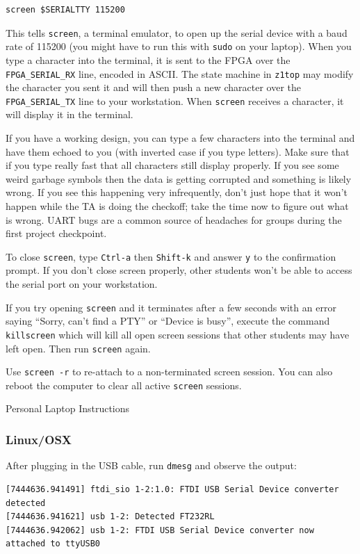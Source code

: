 \documentclass[11pt]{article}
\makeatletter
\renewcommand{\subsection}
{\@startsection {subsection}{1}{0pt}
 {-1ex}
 {0.5ex}
 {\bfseries\normalsize}}
\makeatother
\begin{document}
\begin{verbatim}
screen $SERIALTTY 115200
\end{verbatim}

This tells \verb|screen|, a terminal emulator, to open up the serial device with a baud rate of 115200 (you might have to run this with \verb|sudo| on your laptop).
When you type a character into the terminal, it is sent to the FPGA over the \verb|FPGA_SERIAL_RX| line, encoded in ASCII.
The state machine in \verb|z1top| may modify the character you sent it and will then push a new character over the \verb|FPGA_SERIAL_TX| line to your workstation.
When \verb|screen| receives a character, it will display it in the terminal.

If you have a working design, you can type a few characters into the terminal and have them echoed to you (with inverted case if you type letters).
Make sure that if you type really fast that all characters still display properly.
If you see some weird garbage symbols then the data is getting corrupted and something is likely wrong.
If you see this happening very infrequently, don't just hope that it won't happen while the TA is doing the checkoff; take the time now to figure out what is wrong.
UART bugs are a common source of headaches for groups during the first project checkpoint.

To close \verb|screen|, type \verb|Ctrl-a| then \verb|Shift-k| and answer \verb|y| to the confirmation prompt.
If you don't close screen properly, other students won't be able to access the serial port on your workstation.

If you try opening \verb|screen| and it terminates after a few seconds with an error saying ``Sorry, can't find a PTY'' or ``Device is busy'', execute the command \verb|killscreen| which will kill all open screen sessions that other students may have left open.
Then run \verb|screen| again.

Use \verb|screen -r| to re-attach to a non-terminated screen session. You can also reboot the computer to clear all active \verb|screen| sessions.

\subsection{Personal Laptop Instructions}

\subsubsection{Linux/OSX}
After plugging in the USB cable, run \verb|dmesg| and observe the output:
\begin{verbatim}
[7444636.941491] ftdi_sio 1-2:1.0: FTDI USB Serial Device converter detected
[7444636.941621] usb 1-2: Detected FT232RL
[7444636.942062] usb 1-2: FTDI USB Serial Device converter now attached to ttyUSB0
\end{verbatim}
\end{document}
